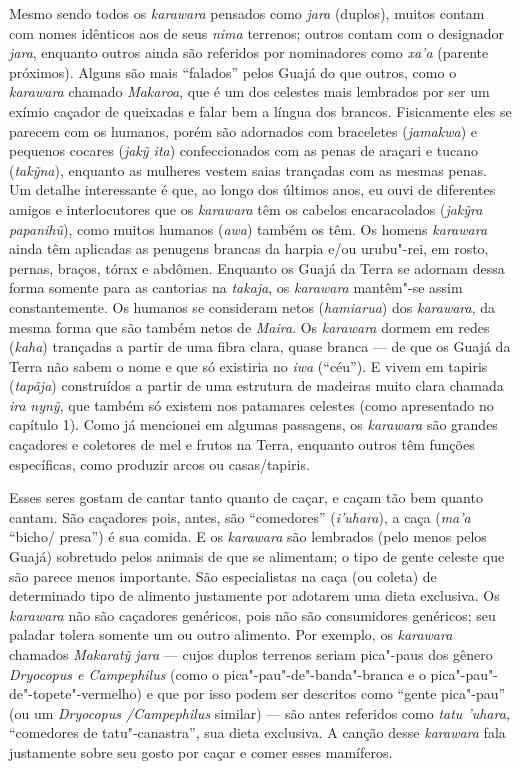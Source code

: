 Mesmo sendo todos os \emph{karawara} pensados como \emph{jara} (duplos),
muitos contam com nomes idênticos aos de seus \emph{nima} terrenos;
outros contam com o designador \emph{jara}, enquanto outros ainda são
referidos por nominadores como \emph{xa'a} (parente próximos). Alguns
são mais ``falados'' pelos Guajá do que outros, como o \emph{karawara}
chamado \emph{Makaroa}, que é um dos celestes mais lembrados por ser um
exímio caçador de queixadas e falar bem a língua dos brancos.
Fisicamente eles se parecem com os humanos, porém são adornados com
braceletes (\emph{jamakwa}) e pequenos cocares (\emph{jakỹ ita})
confeccionados com as penas de araçari e tucano (\emph{takỹna}),
enquanto as mulheres vestem saias trançadas com as mesmas penas. Um
detalhe interessante é que, ao longo dos últimos anos, eu ouvi de
diferentes amigos e interlocutores que os \emph{karawara} têm os cabelos
encaracolados (\emph{jakỹra papanihũ}), como muitos humanos
(\emph{awa}) também os têm. Os homens \emph{karawara} ainda têm
aplicadas as penugens brancas da harpia e/ou urubu"-rei, em rosto,
pernas, braços, tórax e abdômen. Enquanto os Guajá da Terra se adornam
dessa forma somente para as cantorias na \emph{takaja}, os
\emph{karawara} mantêm"-se assim constantemente. Os humanos se consideram
netos (\emph{hamiarua}) dos \emph{karawara}, da mesma forma que são
também netos de \emph{Maira}. Os \emph{karawara} dormem em redes
(\emph{kaha}) trançadas a partir de uma fibra clara, quase branca --- de
que os Guajá da Terra não sabem o nome e que só existiria no \emph{iwa}
(``céu''). E vivem em tapiris (\emph{tapãja}) construídos a partir de
uma estrutura de madeiras muito clara chamada \emph{ira} \emph{nynỹ},
que também só existem nos patamares celestes (como apresentado no
capítulo 1). Como já mencionei em algumas passagens, os \emph{karawara}
são grandes caçadores e coletores de mel e frutos na Terra, enquanto
outros têm funções específicas, como produzir arcos ou casas/tapiris.

Esses seres gostam de cantar tanto quanto de caçar, e caçam tão bem
quanto cantam. São caçadores pois, antes, são ``comedores''
(\emph{i'uhara}), a caça (\emph{ma'a} ``bicho/ presa'') é sua comida. E
os \emph{karawara} são lembrados (pelo menos pelos Guajá) sobretudo
pelos animais de que se alimentam; o tipo de gente celeste que são
parece menos importante. São especialistas na caça (ou coleta) de
determinado tipo de alimento justamente por adotarem uma dieta
exclusiva. Os \emph{karawara} não são caçadores genéricos, pois não são
consumidores genéricos; seu paladar tolera somente um ou outro alimento.
Por exemplo, os \emph{karawara} chamados \emph{Makaratỹ jara} --- cujos
duplos terrenos seriam pica"-paus dos gênero \emph{Dryocopus e
Campephilus} (como o pica"-pau"-de"-banda"-branca e o
pica"-pau"-de"-topete"-vermelho) e que por isso podem ser descritos como
``gente pica"-pau'' (ou um \emph{Dryocopus /Campephilus} similar) --- são
antes referidos como \emph{tatu 'uhara,} ``comedores de tatu"-canastra'',
sua dieta exclusiva. A canção desse \emph{karawara} fala justamente
sobre seu gosto por caçar e comer esses mamíferos.

